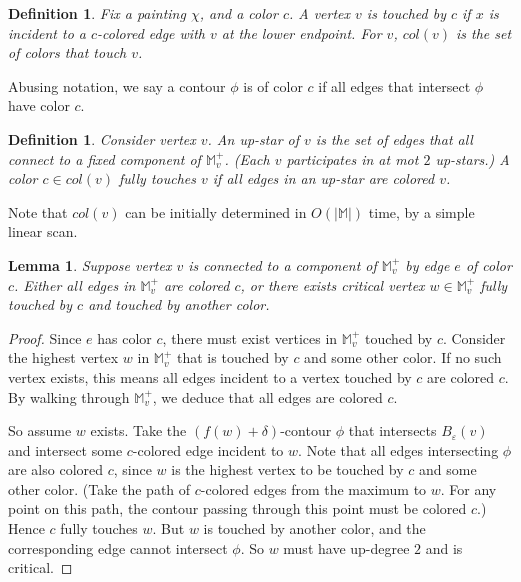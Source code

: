\documentclass[11pt]{article}
\newtheorem{lemma}[theorem]{Lemma}
\newtheorem{definition}[theorem]{Definition}
\theoremstyle{definition}
\newcommand{\MM}{\mathbb{M}}
\newcommand{\eps}{\varepsilon}
\newcommand{\col}{col}
\newcommand{\fcol}{full}
\begin{document}
\begin{definition} \label{def:color-set} Fix a painting $\chi$, and a color $c$.
A vertex $v$ is \emph{touched by $c$} if $x$ is incident to a $c$-colored
edge with $v$ at the lower endpoint. For $v$, $\col(v)$ is the set of colors that touch $v$.
\end{definition}

Abusing notation, we say a contour $\phi$ is of color $c$ if all edges that intersect $\phi$ have color $c$.

\begin{definition} \label{def:color-full} Consider vertex $v$. An \emph{up-star} of $v$ is the set 
of edges that all connect to a fixed component of $\MM^+_v$. (Each $v$
participates in at mot $2$ up-stars.) A color $c \in \col(v)$ \emph{fully touches} $v$
if all edges in an up-star are colored $v$.
\end{definition}

Note that $\col(v)$ 
can be initially determined in $O(|\MM|)$ time, by a simple linear scan.

\begin{lemma} \label{lem:full} Suppose vertex $v$ is connected to a component of $\MM^+_v$
by edge $e$ of color $c$. Either all edges in $\MM^+_v$ are colored $c$, or there
exists critical vertex $w \in \MM^+_v$ fully touched by $c$ and touched by another color.
%
\end{lemma}

\begin{proof} Since $e$ has color $c$,
there must exist vertices in $\MM^+_v$ touched by $c$. Consider the highest
vertex $w$ in $\MM^+_v$ that is touched by $c$ and some other color. If no such vertex exists,
this means all edges incident to a vertex touched by $c$ are colored $c$. By walking through
$\MM^+_v$, we deduce that all edges are colored $c$. 

So assume $w$ exists. Take the $(f(w)+\delta)$-contour $\phi$ that intersects $B_\eps(v)$
and intersect some $c$-colored edge incident to $w$. Note that all edges intersecting $\phi$ are also colored $c$,
since $w$ is the highest vertex to be touched by $c$ and some other color. (Take the path of $c$-colored
edges from the maximum to $w$. For any point on this path, the contour passing through this point must
be colored $c$.) Hence $c$ fully touches $w$. 
But $w$ is touched by another color, and the corresponding edge cannot intersect $\phi$. So $w$
must have up-degree $2$ and is critical.
\end{proof}
\end{document}
